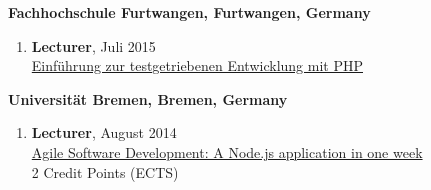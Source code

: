 \documentclass[10pt]{article}
\newenvironment{outerlist}[1][\enskip\textbullet]%
          {\begin{enumerate}[#1]}{\end{enumerate}%
           \vspace{-.6\baselineskip}}
\begin{document}
  \textbf{Fachhochschule Furtwangen, Furtwangen, Germany}
  \begin{outerlist}
    \item[]
    {\bf Lecturer}, Juli 2015\\
   \href{http://scientifica.de/bildungsangebote/informatica-feminale-bw/informatica-feminale-bw-2015/if-kurse-2015/detailansicht/?tx_seminars_pi1%5BshowUid%5D=58}{Einf\"uhrung zur testgetriebenen Entwicklung mit PHP}  \\
  \end{outerlist}

  \textbf{Universit\"at Bremen, Bremen, Germany}
  \begin{outerlist}
    \item[]
    {\bf Lecturer}, August 2014\\
   \href{https://www.informatica-feminale.de/Archiv/Sommerstudium/Sommer2014/Agil.php#AGI03}{Agile Software Development: A Node.js application in one week}  \\
      2 Credit Points (ECTS)\\

  \end{outerlist}
\end{document}
